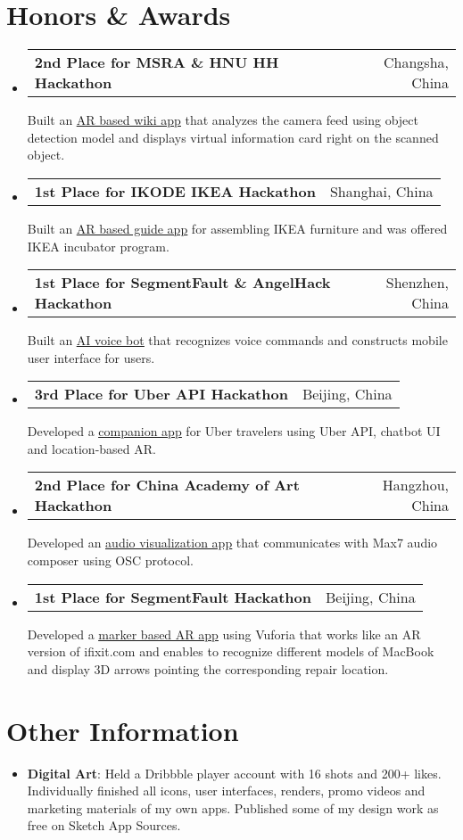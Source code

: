 \documentclass[letterpaper,11pt]{article}
\makeatletter
\newcommand{\resumeSubheadingExtended}[3]{
  \vspace{-0pt}\item
    \begin{tabular*}{0.97\textwidth}[t]{l@{\extracolsep{\fill}}r}
      \textbf{#1} & #2
    \end{tabular*}\vspace{-0pt}
    #3
    \vspace{-6pt}
}
\newcommand{\resumeSubHeadingListStart}{\begin{itemize}[leftmargin=*]}
\newcommand{\resumeSubHeadingListEnd}{\end{itemize}}
\makeatother
\begin{document}
\section{Honors \& Awards}
\resumeSubHeadingListStart
  	\resumeSubheadingExtended{2nd Place for MSRA \& HNU HH Hackathon}{Changsha, China}{Built an \underline{\href{https://github.com/JustinFincher/AReco}{AR based wiki app}} that analyzes the camera feed using object detection model and displays virtual information card right on the scanned object.}
	\resumeSubheadingExtended{1st Place for IKODE IKEA Hackathon}{Shanghai, China}
	{Built an \underline{\href{https://github.com/hACKbUSTER/IKEA-Maker}{AR based guide app}} for assembling IKEA furniture and was offered IKEA incubator program.}
	\resumeSubheadingExtended{1st Place for SegmentFault \& AngelHack Hackathon}{Shenzhen, China}
	{Built an \underline{\href{https://github.com/hACKbUSTER/ProjectDaVinci}{AI voice bot}} that recognizes voice commands and constructs mobile user interface for users.}
	\resumeSubheadingExtended{3rd Place for Uber API Hackathon}{Beijing, China}
	{Developed a \underline{\href{https://github.com/hACKbUSTER/UberGuide-iOS}{companion app}} for Uber travelers using Uber API, chatbot UI and location-based AR.}
	\resumeSubheadingExtended{2nd Place for China Academy of Art Hackathon}{Hangzhou, China}
	{Developed an \underline{\href{https://github.com/hACKbUSTER/Renaissance}{audio visualization app}} that communicates with Max7 audio composer using OSC protocol.}
	\resumeSubheadingExtended{1st Place for SegmentFault Hackathon}{Beijing, China}
	{Developed a \underline{\href{https://github.com/hACKbUSTER/FixPlusPlus}{marker based AR app}} using Vuforia that works like an AR version of ifixit.com and enables to recognize different models of MacBook and display 3D arrows pointing the corresponding repair location.}
\resumeSubHeadingListEnd

\section{Other Information}
  \resumeSubHeadingListStart
    \item{
      \textbf{Digital Art}{: Held a Dribbble player account with 16 shots and 200+ likes. Individually finished all icons, user interfaces, renders, promo videos and marketing materials of my own apps. Published some of my  design work as free on Sketch App Sources.}
    }
  \resumeSubHeadingListEnd

\end{document}
